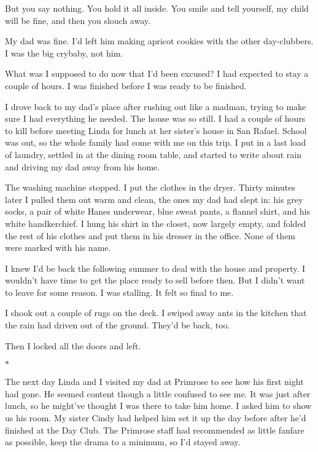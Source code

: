 \documentclass[12pt]{book}
\begin{document}
But you say nothing. You hold it all inside. You smile and tell yourself, my child will be fine, and then you slouch away.

My dad was fine. I'd left him making apricot cookies with the other day-clubbers. I was the big crybaby, not him.

What was I supposed to do now that I'd been excused? I had expected to stay a couple of hours. I was finished before I was ready to be finished.

I drove back to my dad's place after rushing out like a madman, trying to make sure I had everything he needed. The house was so still. I had a couple of hours to kill before meeting Linda for lunch at her sister's house in San Rafael. School was out, so the whole family had come with me on this trip. I put in a last load of laundry, settled in at the dining room table, and started to write about rain and driving my dad away from his home.

The washing machine stopped. I put the clothes in the dryer. Thirty minutes later I pulled them out warm and clean, the ones my dad had slept in: his grey socks, a pair of white Hanes underwear, blue sweat pants, a flannel shirt, and his white handkerchief. I hung his shirt in the closet, now largely empty, and folded the rest of his clothes and put them in his dresser in the office. None of them were marked with his name.

I knew I'd be back the following summer to deal with the house and property. I wouldn't have time to get the place ready to sell before then. But I didn't want to leave for some reason. I was stalling. It felt so final to me.

I shook out a couple of rugs on the deck. I swiped away ants in the kitchen that the rain had driven out of the ground. They'd be back, too.

Then I locked all the doors and left.

\begin{center}$*$\end{center}

The next day Linda and I visited my dad at Primrose to see how his first night had gone. He seemed content though a little confused to see me. It was just after lunch, so he might've thought I was there to take him home. I asked him to show us his room. My sister Cindy had helped him set it up the day before after he'd finished at the Day Club. The Primrose staff had recommended as little fanfare as possible, keep the drama to a minimum, so I'd stayed away.
\end{document}

